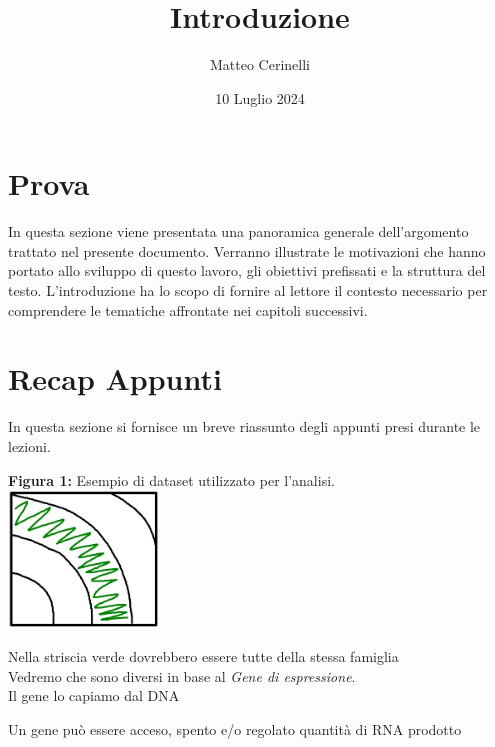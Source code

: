 \documentclass{report}
\title{Introduzione}
\author{Matteo Cerinelli}
\date{10 Luglio 2024}
\begin{document}
\maketitle

\section*{Prova}

In questa sezione viene presentata una panoramica generale dell'argomento trattato nel presente documento. 
Verranno illustrate le motivazioni che hanno portato allo sviluppo di questo lavoro, gli obiettivi prefissati e la struttura del testo. 
L'introduzione ha lo scopo di fornire al lettore il contesto necessario per comprendere le tematiche affrontate nei capitoli successivi.



\section{Recap Appunti}

In questa sezione si fornisce un breve riassunto degli appunti presi durante le lezioni.


\begin{center}
    \label{dataset}
    \textbf{Figura 1:} Esempio di dataset utilizzato per l'analisi.\\
    \includegraphics[width=0.3\textwidth]{./Pictures/EsempioDataset.png}
    
    Nella striscia verde dovrebbero essere tutte della stessa famiglia\\
    Vedremo che sono diversi in base al \textit{Gene di espressione}.\\
    Il gene lo capiamo dal DNA
\end{center}


Un gene può essere acceso, spento e/o regolato \textrightarrow \space quantità di RNA prodotto
\end{document}
